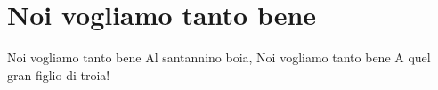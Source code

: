 \section{Noi vogliamo tanto bene}
\subtitle{Sulla base di “Noi vogliamo tanto bene alla Polizia Italiana”}
\begin{canzone}
Noi vogliamo tanto bene 
Al santannino boia,
Noi vogliamo tanto bene 
A quel gran figlio di troia!
\end{canzone}
